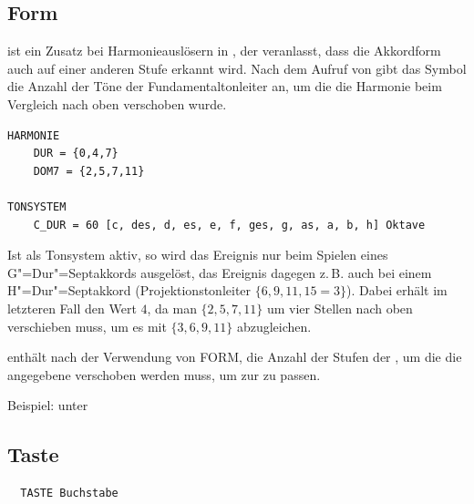 {
\subsection{Form}
\label{sec:SX_SHIFTED}

 ist ein Zusatz bei Harmonieauslösern in
, der veranlasst, dass die Akkordform
auch auf einer anderen Stufe erkannt wird. Nach dem Aufruf von
 gibt das Symbol  die Anzahl der Töne
der Fundamentaltonleiter an, um die die Harmonie beim Vergleich nach
oben verschoben wurde.




\begin{verbatim}
HARMONIE  
    DUR = {0,4,7}  
    DOM7 = {2,5,7,11}

TONSYSTEM  
    C_DUR = 60 [c, des, d, es, e, f, ges, g, as, a, b, h] Oktave
\end{verbatim}



Ist  als Tonsystem aktiv, so wird das Ereignis  nur 
beim Spielen eines G"=Dur"=Septakkords ausgelöst, das Ereignis 
 dagegen z.\,B. auch bei einem H"=Dur"=Septakkord (Projektionstonleiter 
$\{6,9,11,15=3\}$). Dabei erhält im letzteren Fall  den 
Wert $4$, da man $\{2,5,7,11\}$ um vier Stellen nach oben verschieben 
muss, um es mit $\{3,6,9,11\}$ abzugleichen. 


\label{sec:SX_DISTANCE}

 enthält nach der Verwendung von FORM, die Anzahl der
Stufen der , um
die die angegebene  verschoben werden muss, um zur
 zu passen.


Beispiel: unter 


\subsection{Taste}
\label{sec:SX_KEY}



\begin{verbatim}
  TASTE Buchstabe
\end{verbatim}




}

